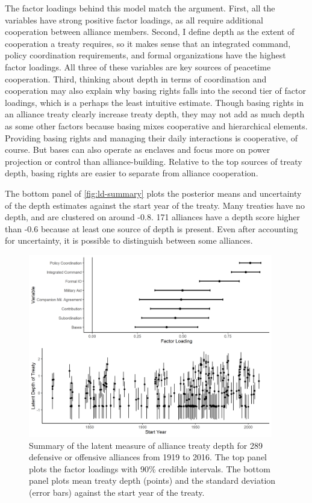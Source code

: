 \documentclass[12pt]{article}
\begin{document}
The factor loadings behind this model match the argument. 
First, all the variables have strong positive factor loadings, as all require additional cooperation between alliance members. 
Second, I define depth as the extent of cooperation a treaty requires, so it makes sense that an integrated command, policy coordination requirements, and formal organizations have the highest factor loadings. 
All three of these variables are key sources of peacetime cooperation. 
Third, thinking about depth in terms of coordination and cooperation may also explain why basing rights falls into the second tier of factor loadings, which is a perhaps the least intuitive estimate. 
Though basing rights in an alliance treaty clearly increase treaty depth, they may not add as much depth as some other factors because basing mixes cooperative and hierarchical elements. 
Providing basing rights and managing their daily interactions is cooperative, of course. 
But bases can also operate as enclaves and focus more on power projection or control than alliance-building.  
Relative to the top sources of treaty depth, basing rights are easier to separate from alliance cooperation. 


The bottom panel of \autoref{fig:ld-summary} plots the posterior means and uncertainty of the depth estimates against the start year of the treaty. 
Many treaties have no depth, and are clustered on around -0.8.  
171 alliances have a depth score higher than -0.6 because at least one source of depth is present. 
Even after accounting for uncertainty, it is possible to distinguish between some alliances. 


\begin{figure}
	\centering
		\includegraphics[width=0.95\textwidth]{../figures/ld-summary.png}
	\caption{Summary of the latent measure of alliance treaty depth for 289 defensive or offensive alliances from 1919 to 2016. The top panel plots the factor loadings with 90\% credible intervals. The bottom panel plots mean treaty depth (points) and the standard deviation (error bars) against the start year of the treaty.}
	\label{fig:ld-summary}
\end{figure}
\end{document}
